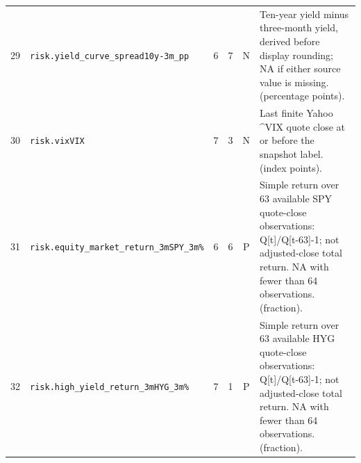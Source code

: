 \begin{table}[t]
\begin{tabular}{@{}rp{}cccp{}@{}}
29 & \texttt{risk.\allowbreak{}yield\_\allowbreak{}curve\_\allowbreak{}spread}\newline \texttt{10y-\allowbreak{}3m\_\allowbreak{}pp} & 6 & 7 & N & Ten-year yield minus three-month yield, derived before display rounding; NA if either source value is missing. (percentage points). \\[2pt]
30 & \texttt{risk.\allowbreak{}vix}\newline \texttt{VIX} & 7 & 3 & N & Last finite Yahoo \textasciicircum{}VIX quote close at or before the snapshot label. (index points). \\[2pt]
31 & \texttt{risk.\allowbreak{}equity\_\allowbreak{}market\_\allowbreak{}return\_\allowbreak{}3m}\newline \texttt{SPY\_\allowbreak{}3m\%} & 6 & 6 & P & Simple return over 63 available SPY quote-close observations: Q[t]/Q[t-63]-1; not adjusted-close total return. NA with fewer than 64 observations. (fraction). \\[2pt]
32 & \texttt{risk.\allowbreak{}high\_\allowbreak{}yield\_\allowbreak{}return\_\allowbreak{}3m}\newline \texttt{HYG\_\allowbreak{}3m\%} & 7 & 1 & P & Simple return over 63 available HYG quote-close observations: Q[t]/Q[t-63]-1; not adjusted-close total return. NA with fewer than 64 observations. (fraction). \\[2pt]
\bottomrule
\end{tabular}
\end{table}

